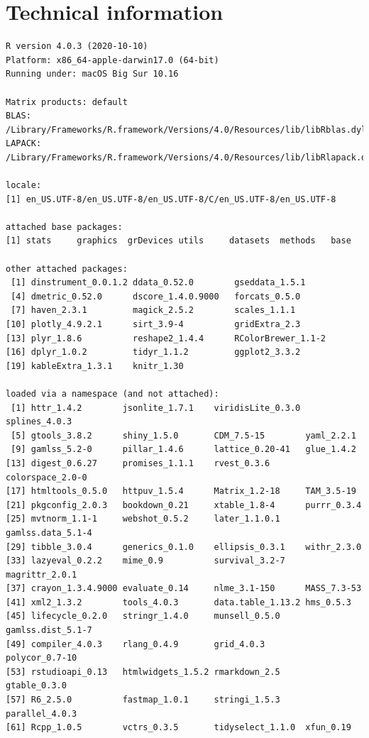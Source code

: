 \documentclass[
]{book}
\begin{document}
\hypertarget{ap:technical}{%
\chapter{Technical information}\label{ap:technical}}

\begin{verbatim}
R version 4.0.3 (2020-10-10)
Platform: x86_64-apple-darwin17.0 (64-bit)
Running under: macOS Big Sur 10.16

Matrix products: default
BLAS:   /Library/Frameworks/R.framework/Versions/4.0/Resources/lib/libRblas.dylib
LAPACK: /Library/Frameworks/R.framework/Versions/4.0/Resources/lib/libRlapack.dylib

locale:
[1] en_US.UTF-8/en_US.UTF-8/en_US.UTF-8/C/en_US.UTF-8/en_US.UTF-8

attached base packages:
[1] stats     graphics  grDevices utils     datasets  methods   base     

other attached packages:
 [1] dinstrument_0.0.1.2 ddata_0.52.0        gseddata_1.5.1     
 [4] dmetric_0.52.0      dscore_1.4.0.9000   forcats_0.5.0      
 [7] haven_2.3.1         magick_2.5.2        scales_1.1.1       
[10] plotly_4.9.2.1      sirt_3.9-4          gridExtra_2.3      
[13] plyr_1.8.6          reshape2_1.4.4      RColorBrewer_1.1-2 
[16] dplyr_1.0.2         tidyr_1.1.2         ggplot2_3.3.2      
[19] kableExtra_1.3.1    knitr_1.30         

loaded via a namespace (and not attached):
 [1] httr_1.4.2        jsonlite_1.7.1    viridisLite_0.3.0 splines_4.0.3    
 [5] gtools_3.8.2      shiny_1.5.0       CDM_7.5-15        yaml_2.2.1       
 [9] gamlss_5.2-0      pillar_1.4.6      lattice_0.20-41   glue_1.4.2       
[13] digest_0.6.27     promises_1.1.1    rvest_0.3.6       colorspace_2.0-0 
[17] htmltools_0.5.0   httpuv_1.5.4      Matrix_1.2-18     TAM_3.5-19       
[21] pkgconfig_2.0.3   bookdown_0.21     xtable_1.8-4      purrr_0.3.4      
[25] mvtnorm_1.1-1     webshot_0.5.2     later_1.1.0.1     gamlss.data_5.1-4
[29] tibble_3.0.4      generics_0.1.0    ellipsis_0.3.1    withr_2.3.0      
[33] lazyeval_0.2.2    mime_0.9          survival_3.2-7    magrittr_2.0.1   
[37] crayon_1.3.4.9000 evaluate_0.14     nlme_3.1-150      MASS_7.3-53      
[41] xml2_1.3.2        tools_4.0.3       data.table_1.13.2 hms_0.5.3        
[45] lifecycle_0.2.0   stringr_1.4.0     munsell_0.5.0     gamlss.dist_5.1-7
[49] compiler_4.0.3    rlang_0.4.9       grid_4.0.3        polycor_0.7-10   
[53] rstudioapi_0.13   htmlwidgets_1.5.2 rmarkdown_2.5     gtable_0.3.0     
[57] R6_2.5.0          fastmap_1.0.1     stringi_1.5.3     parallel_4.0.3   
[61] Rcpp_1.0.5        vctrs_0.3.5       tidyselect_1.1.0  xfun_0.19        
\end{verbatim}
\end{document}
